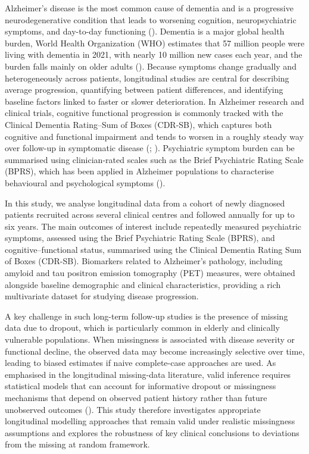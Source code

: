 \documentclass[
  9pt,
  letterpaper,
  DIV=11,
  numbers=noendperiod]{scrartcl}
\begin{document}
Alzheimer's disease is the most common cause of dementia and is a
progressive neurodegenerative condition that leads to worsening
cognition, neuropsychiatric symptoms, and day-to-day functioning
().
Dementia is a major global health burden, World Health Organization
(WHO) estimates that 57 million people were living with dementia in
2021, with nearly 10 million new cases each year, and the burden falls
mainly on older adults (). Because symptoms change gradually and
heterogeneously across patients, longitudinal studies are central for
describing average progression, quantifying between patient differences,
and identifying baseline factors linked to faster or slower
deterioration. In Alzheimer research and clinical trials, cognitive
functional progression is commonly tracked with the Clinical Dementia
Rating--Sum of Boxes (CDR-SB), which captures both cognitive and
functional impairment and tends to worsen in a roughly steady way over
follow-up in symptomatic disease
(;
).
Psychiatric symptom burden can be summarised using clinician-rated
scales such as the Brief Psychiatric Rating Scale (BPRS), which has been
applied in Alzheimer populations to characterise behavioural and
psychological symptoms ().

In this study, we analyse longitudinal data from a cohort of newly
diagnosed patients recruited across several clinical centres and
followed annually for up to six years. The main outcomes of interest
include repeatedly measured psychiatric symptoms, assessed using the
Brief Psychiatric Rating Scale (BPRS), and cognitive--functional status,
summarised using the Clinical Dementia Rating Sum of Boxes (CDR-SB).
Biomarkers related to Alzheimer's pathology, including amyloid and tau
positron emission tomography (PET) measures, were obtained alongside
baseline demographic and clinical characteristics, providing a rich
multivariate dataset for studying disease progression.

A key challenge in such long-term follow-up studies is the presence of
missing data due to dropout, which is particularly common in elderly and
clinically vulnerable populations. When missingness is associated with
disease severity or functional decline, the observed data may become
increasingly selective over time, leading to biased estimates if naive
complete-case approaches are used. As emphasised in the longitudinal
missing-data literature, valid inference requires statistical models
that can account for informative dropout or missingness mechanisms that
depend on observed patient history rather than future unobserved
outcomes (). This study therefore investigates appropriate longitudinal
modelling approaches that remain valid under realistic missingness
assumptions and explores the robustness of key clinical conclusions to
deviations from the missing at random framework.
\end{document}
